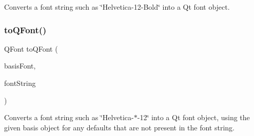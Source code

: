 Converts a font string such as \char`\"{}\+Helvetica-\/12-\/\+Bold\char`\"{} into a Qt font object. 

\mbox{\label{classGFont_a7eea6ca714d168dc53c86124bb4fc387}} 
\subsubsection{\texorpdfstring{to\+Q\+Font()}{toQFont()}\hspace{0.1cm}{\footnotesize\ttfamily [2/2]}}
{\footnotesize\ttfamily Q\+Font to\+Q\+Font (\begin{DoxyParamCaption}\item[{const Q\+Font \&}]{basis\+Font,  }\item[{const std\+::string \&}]{font\+String }\end{DoxyParamCaption})\hspace{0.3cm}{\ttfamily [static]}}



Converts a font string such as \char`\"{}\+Helvetica-\/$\ast$-\/12\char`\"{} into a Qt font object, using the given \textquotesingle{}basis\textquotesingle{} object for any defaults that are not present in the font string. 

